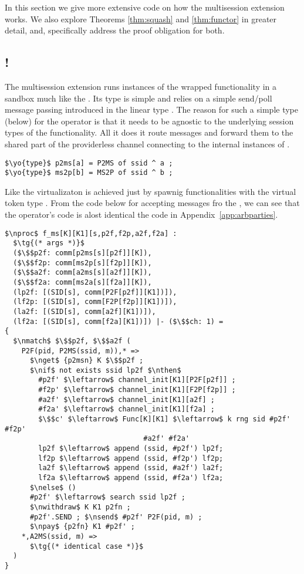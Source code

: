 In this section we give more extensive code on how the multisession extension works. 
We also explore Theorems \ref{thm:squash} and \ref{thm:functor} in greater detail, and, specifically address the proof obligation for both.

\subsection{!\F}
The multisession extension runs instances of the wrapped functionality in a sandbox much like the \partywrapper.
Its type is simple and relies on a simple send/poll message passing introduced in the linear type .
The reason for such a simple type (below) for the operator is that it needs to be agnostic to the underlying session types 
of the functionality. All it does it route messages and forward them to the shared part of the providerless channel
connecting to the internal instances of \F.

\begin{lstlisting}[basicstyle=\small\BeraMonottFamily, mathescape]
$\yo{type}$ p2ms[a] = P2MS of ssid ^ a ;
$\yo{type}$ ms2p[b] = MS2P of ssid ^ b ;
\end{lstlisting}

Like the \partywrapper virtualizaton is achieved just by spawnig functionalities with the virtual token type .
From the code below for accepting messages fro the \partywrapper, we can see that the operator's code is alost identical the code in Appendix~\ref{app:arbparties}.
\begin{lstlisting}[basicstyle=\footnotesize\BeraMonottFamily, frame=single, mathescape]
$\nproc$ f_ms[K][K1][s,p2f,f2p,a2f,f2a] :
  $\tg{(* args *)}$
  ($\$$p2f: comm[p2ms[s][p2f]][K]), 
  ($\$$f2p: comm[ms2p[s][f2p]][K]),
  ($\$$a2f: comm[a2ms[s][a2f]][K]), 
  ($\$$f2a: comm[ms2a[s][f2a]][K]),
  (lp2f: [(SID[s], comm[P2F[p2f]][K1])]), 
  (lf2p: [(SID[s], comm[F2P[f2p]][K1])]),
  (la2f: [(SID[s], comm[a2f][K1])]), 
  (lf2a: [(SID[s], comm[f2a][K1])]) |- ($\$$ch: 1) =
{
  $\nmatch$ $\$$p2f, $\$$a2f (
    P2F(pid, P2MS(ssid, m)),* =>
      $\nget$ {p2msn} K $\$$p2f ;
      $\nif$ not exists ssid lp2f $\nthen$
        #p2f' $\leftarrow$ channel_init[K1][P2F[p2f]] ;
        #f2p' $\leftarrow$ channel_init[K1][F2P[f2p]] ;
        #a2f' $\leftarrow$ channel_init[K1][a2f] ;
        #f2a' $\leftarrow$ channel_init[K1][f2a] ;
        $\$$c' $\leftarrow$ Func[K][K1] $\leftarrow$ k rng sid #p2f' #f2p' 
                                 #a2f' #f2a'
        lp2f $\leftarrow$ append (ssid, #p2f') lp2f; 
        lf2p $\leftarrow$ append (ssid, #f2p') lf2p;
        la2f $\leftarrow$ append (ssid, #a2f') la2f; 
        lf2a $\leftarrow$ append (ssid, #f2a') lf2a;
      $\nelse$ ()
      #p2f' $\leftarrow$ search ssid lp2f ;
      $\nwithdraw$ K K1 p2fn ;
      #p2f'.SEND ; $\nsend$ #p2f' P2F(pid, m) ; 
      $\npay$ {p2fn} K1 #p2f' ;
    *,A2MS(ssid, m) => 
      $\tg{(* identical case *)}$
  )
}
\end{lstlisting}

